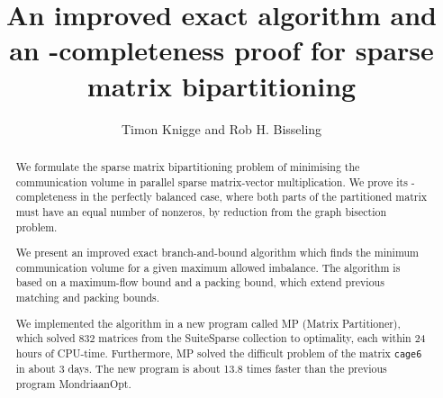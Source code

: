 \documentclass{article}
\title{An improved exact algorithm and an \NP-completeness proof for sparse matrix bipartitioning}
\author{Timon Knigge and Rob H. Bisseling}
\begin{document}
	\maketitle

	\begin{abstract}
		We formulate the sparse matrix bipartitioning problem of
		minimising the communication volume in parallel sparse
		matrix-vector multiplication. We prove its \NP-completeness
		in the perfectly balanced case, where both parts of the
		partitioned matrix must have an equal number of nonzeros,
		by reduction from the graph bisection problem.

		We present an improved exact branch-and-bound algorithm
		which finds the minimum communication volume for a given
		maximum allowed imbalance. The algorithm is based on a
		maximum-flow bound and a packing bound, which extend
		previous matching and packing bounds.

		We implemented the algorithm in a new program called MP
		(Matrix Partitioner), which solved 832 matrices from the
		SuiteSparse collection to optimality, each within 24 hours
		of CPU-time. Furthermore, MP solved the difficult problem
		of the matrix \texttt{cage6} in about 3 days. The new
		program is about 13.8 times faster than the previous program
		MondriaanOpt.
	\end{abstract}

	
	
	
	
	
	

	
	
\end{document}
